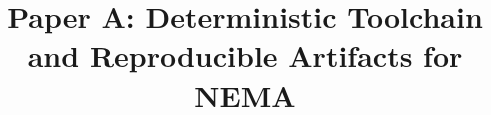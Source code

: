 \documentclass[sigplan,review,anonymous]{acmart}
\newcommand{\toolname}[1]{\textsc{#1}}
\begin{document}
\title{Paper A: Deterministic Toolchain and Reproducible Artifacts for \toolname{NEMA}}



\maketitle











\end{document}
